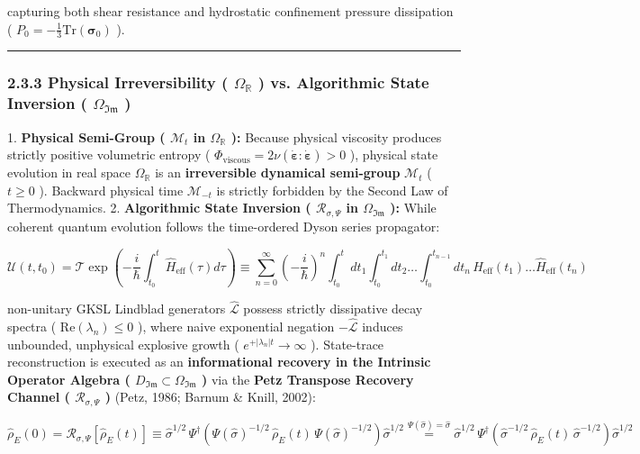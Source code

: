 \documentclass[11pt,a4paper]{article}
\theoremstyle{definition}\newtheorem{definition}{Definition}
\theoremstyle{remark}\newtheorem{remark}{Remark}
\begin{document}
capturing both shear resistance and hydrostatic confinement pressure dissipation ( $P_0 = -\frac{1}{3}\mathrm{Tr}(\boldsymbol{\sigma}_0)$ ).

\noindent\rule{\linewidth}{0.4pt}
\subsubsection{2.3.3 Physical Irreversibility ( $\Omega_{\mathbb{R}}$ ) vs. Algorithmic State Inversion ( $\Omega_{\mathfrak{Im}}$ )}

1. \textbf{Physical Semi-Group ( $\mathcal{M}_t$ in $\Omega_{\mathbb{R}}$ ):}
Because physical viscosity produces strictly positive volumetric entropy ( $\Phi_{\text{viscous}} = 2\nu (\dot{\boldsymbol{\varepsilon}}:\dot{\boldsymbol{\varepsilon}}) > 0$ ), physical state evolution in real space $\Omega_{\mathbb{R}}$ is an \textbf{irreversible dynamical semi-group} $\mathcal{M}_t$ ( $t \ge 0$ ). Backward physical time $\mathcal{M}_{-t}$ is strictly forbidden by the Second Law of Thermodynamics.
2. \textbf{Algorithmic State Inversion ( $\mathcal{R}_{\sigma, \Psi}$ in $\Omega_{\mathfrak{Im}}$ ):}
While coherent quantum evolution follows the time-ordered Dyson series propagator:


\begin{equation}
\mathcal{U}(t, t_0) = \mathcal{T} \exp\left(-\frac{i}{\hbar}\int_{t_0}^t \hat{H}_{\text{eff}}(\tau)d\tau\right) \equiv \sum_{n=0}^\infty \left(-\frac{i}{\hbar}\right)^n \int_{t_0}^t dt_1 \int_{t_0}^{t_1} dt_2 \dots \int_{t_0}^{t_{n-1}} dt_n \, \hat{H}_{\text{eff}}(t_1)\dots\hat{H}_{\text{eff}}(t_n)
\end{equation}


non-unitary GKSL Lindblad generators $\hat{\mathcal{L}}$ possess strictly dissipative decay spectra ( $\mathrm{Re}(\lambda_n) \le 0$ ), where naive exponential negation $-\hat{\mathcal{L}}$ induces unbounded, unphysical explosive growth ( $e^{+|\lambda_n|t} \to \infty$ ). State-trace reconstruction is executed as an \textbf{informational recovery in the Intrinsic Operator Algebra ( $D_{\mathfrak{Im}} \subset \Omega_{\mathfrak{Im}}$ )} via the \textbf{Petz Transpose Recovery Channel ( $\mathcal{R}_{\sigma, \Psi}$ )} (Petz, 1986; Barnum \& Knill, 2002):


\begin{equation}
\boxed{\hat{\rho}_E(0) = \mathcal{R}_{\sigma, \Psi}[ \hat{\rho}_E(t) ] \equiv \hat{\sigma}^{1/2} \, \Psi^\dagger\left( \Psi(\hat{\sigma})^{-1/2} \, \hat{\rho}_E(t) \, \Psi(\hat{\sigma})^{-1/2} \right) \hat{\sigma}^{1/2} \overset{\Psi(\hat{\sigma})=\hat{\sigma}}{=} \hat{\sigma}^{1/2} \, \Psi^\dagger\left( \hat{\sigma}^{-1/2} \, \hat{\rho}_E(t) \, \hat{\sigma}^{-1/2} \right) \hat{\sigma}^{1/2}}
\end{equation}
\end{document}
